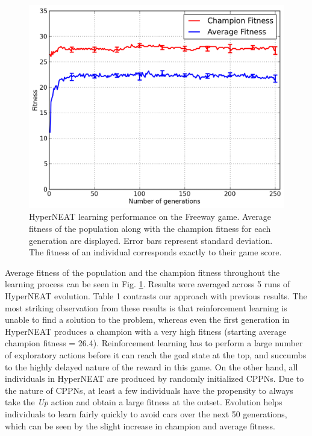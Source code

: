 \documentclass{acm_proc_article-sp}
\begin{document}
\begin{figure}[ht]
\begin{center}
\includegraphics[width=\columnwidth]{figures/freeway-results.png}
\end{center}
\caption{HyperNEAT learning performance on the Freeway game. Average fitness of the population along with the champion fitness for each generation are displayed. Error bars represent standard deviation. The fitness of an individual corresponds exactly to their game score.}
\label{fig:freeway-curve}
\end{figure}


Average fitness of the population and the champion fitness throughout the learning process can be seen in Fig. \ref{fig:freeway-curve}. Results were averaged across 5 runs of HyperNEAT evolution. Table 1 contrasts our approach with previous results. The most striking observation from these results is that reinforcement learning is unable to find a solution to the problem, whereas even the first generation in HyperNEAT produces a champion with a very high fitness (starting average champion fitness = 26.4). Reinforcement learning has to perform a large number of exploratory actions before it can reach the goal state at the top, and succumbs to the highly delayed nature of the reward in this game. On the other hand, all individuals in HyperNEAT are produced by randomly initialized CPPNs. Due to the nature of CPPNs, at least a few individuals have the propensity to always take the \textit{Up} action and obtain a large fitness at the outset. Evolution helps individuals to learn fairly quickly to avoid cars over the next 50 generations, which can be seen by the slight increase in champion and average fitness.
\end{document}
